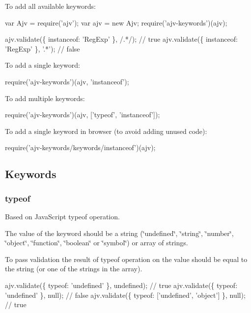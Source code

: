 To add all available keywords\+:


\begin{DoxyCode}
var Ajv = require('ajv');
var ajv = new Ajv;
require('ajv-keywords')(ajv);

ajv.validate(\{ instanceof: 'RegExp' \}, /.*/); // true
ajv.validate(\{ instanceof: 'RegExp' \}, '.*'); // false
\end{DoxyCode}


To add a single keyword\+:


\begin{DoxyCode}
require('ajv-keywords')(ajv, 'instanceof');
\end{DoxyCode}


To add multiple keywords\+:


\begin{DoxyCode}
require('ajv-keywords')(ajv, ['typeof', 'instanceof']);
\end{DoxyCode}


To add a single keyword in browser (to avoid adding unused code)\+:


\begin{DoxyCode}
require('ajv-keywords/keywords/instanceof')(ajv);
\end{DoxyCode}


\subsection*{Keywords}

\subsubsection*{{\ttfamily typeof}}

Based on Java\+Script {\ttfamily typeof} operation.

The value of the keyword should be a string ({\ttfamily \char`\"{}undefined\char`\"{}}, {\ttfamily \char`\"{}string\char`\"{}}, {\ttfamily \char`\"{}number\char`\"{}}, {\ttfamily \char`\"{}object\char`\"{}}, {\ttfamily \char`\"{}function\char`\"{}}, {\ttfamily \char`\"{}boolean\char`\"{}} or {\ttfamily \char`\"{}symbol\char`\"{}}) or array of strings.

To pass validation the result of {\ttfamily typeof} operation on the value should be equal to the string (or one of the strings in the array).


\begin{DoxyCode}
ajv.validate(\{ typeof: 'undefined' \}, undefined); // true
ajv.validate(\{ typeof: 'undefined' \}, null); // false
ajv.validate(\{ typeof: ['undefined', 'object'] \}, null); // true
\end{DoxyCode}


